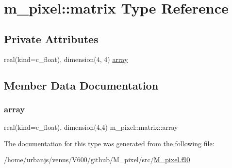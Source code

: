 \hypertarget{structm__pixel_1_1matrix}{}\section{m\+\_\+pixel\+:\+:matrix Type Reference}
\label{structm__pixel_1_1matrix}
\subsection*{Private Attributes}
\begin{DoxyCompactItemize}
\item 
real(kind=c\+\_\+float), dimension(4, 4) \mbox{\hyperlink{structm__pixel_1_1matrix_ae4ebb7c00555ab57a382b4de448b3f95}{array}}
\end{DoxyCompactItemize}


\subsection{Member Data Documentation}
\mbox{\label{structm__pixel_1_1matrix_ae4ebb7c00555ab57a382b4de448b3f95}} 
\subsubsection{\texorpdfstring{array}{array}}
{\footnotesize\ttfamily real(kind=c\+\_\+float), dimension(4,4) m\+\_\+pixel\+::matrix\+::array\hspace{0.3cm}{\ttfamily [private]}}



The documentation for this type was generated from the following file\+:\begin{DoxyCompactItemize}
\item 
/home/urbanjs/venus/\+V600/github/\+M\+\_\+pixel/src/\mbox{\hyperlink{M__pixel_8f90}{M\+\_\+pixel.\+f90}}\end{DoxyCompactItemize}

